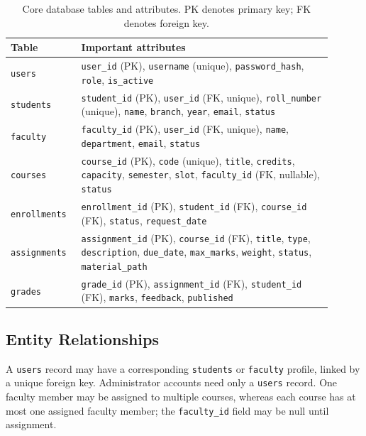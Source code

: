 \begin{table}[H]
\centering
\small
\begin{tabular}{|p{0.18\linewidth}|p{0.72\linewidth}|}
\hline
\textbf{Table} & \textbf{Important attributes} \\ \hline
\texttt{users} & \texttt{user\_id} (PK), \texttt{username} (unique), \texttt{password\_hash}, \texttt{role}, \texttt{is\_active} \\ \hline
\texttt{students} & \texttt{student\_id} (PK), \texttt{user\_id} (FK, unique), \texttt{roll\_number} (unique), \texttt{name}, \texttt{branch}, \texttt{year}, \texttt{email}, \texttt{status} \\ \hline
\texttt{faculty} & \texttt{faculty\_id} (PK), \texttt{user\_id} (FK, unique), \texttt{name}, \texttt{department}, \texttt{email}, \texttt{status} \\ \hline
\texttt{courses} & \texttt{course\_id} (PK), \texttt{code} (unique), \texttt{title}, \texttt{credits}, \texttt{capacity}, \texttt{semester}, \texttt{slot}, \texttt{faculty\_id} (FK, nullable), \texttt{status} \\ \hline
\texttt{enrollments} & \texttt{enrollment\_id} (PK), \texttt{student\_id} (FK), \texttt{course\_id} (FK), \texttt{status}, \texttt{request\_date} \\ \hline
\texttt{assignments} & \texttt{assignment\_id} (PK), \texttt{course\_id} (FK), \texttt{title}, \texttt{type}, \texttt{description}, \texttt{due\_date}, \texttt{max\_marks}, \texttt{weight}, \texttt{status}, \texttt{material\_path} \\ \hline
\texttt{grades} & \texttt{grade\_id} (PK), \texttt{assignment\_id} (FK), \texttt{student\_id} (FK), \texttt{marks}, \texttt{feedback}, \texttt{published} \\ \hline
\end{tabular}
\caption{Core database tables and attributes. PK denotes primary key; FK denotes foreign key.}
\label{tab:database-entities}
\end{table}

\subsection{Entity Relationships}
A \texttt{users} record may have a corresponding \texttt{students} or \texttt{faculty} profile, linked by a unique foreign key. Administrator accounts need only a \texttt{users} record. One faculty member may be assigned to multiple courses, whereas each course has at most one assigned faculty member; the \texttt{faculty\_id} field may be null until assignment.

